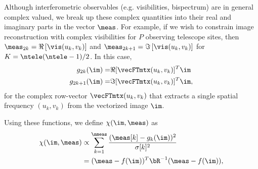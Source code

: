 Although interferometric observables  (e.g. visibilities, bispectrum) are in general complex valued, we break up these complex quantities into their real and imaginary parts in the vector $\meas$.
For example, if we wish to constrain image reconstruction with complex visibilities for $P$ observing telescope sites, then $\meas_{2k} = \Re \left[ \vis(u_k,v_k) \right]$ and  $\meas_{2k+1} = \Im \left[ \vis(u_k,v_k) \right]$ for $K=\ntele(\ntele-1) /2$. In this case, %
\begin{align}
g_{2k} ( \im ) = & \Re[ \vecFTmtx(u_k,v_k) ]^T  \im\\
g_{2k+1} ( \im ) = & \Im[ \vecFTmtx(u_k,v_k) ]^T \im ,
\end{align} 
for the complex row-vector $\vecFTmtx(u_k,v_k)$ that extracts a single spatial frequency $(u_k,v_k)$ from the vectorized image $\im$. %

%


Using these functions, we define $\chi(\im,\meas)$ as
\begin{align}
\chi(\im, \meas) &\propto   \sum_{k=1}^{\nmeas} \frac{(\meas[k] - g_k(\im))^2 }{\sigma[k]^2} \\
& = (\meas - f(\im))^T \bR^{-1} (\meas - f(\im)),
\label{eq:chi2}
\end{align}

